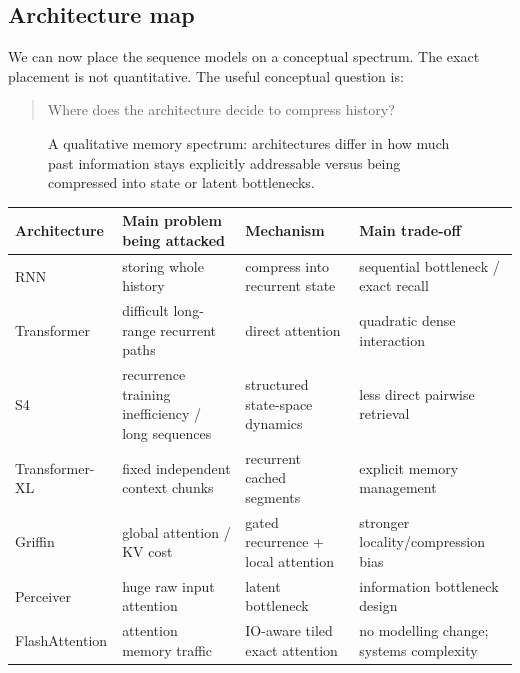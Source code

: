 \subsection{Architecture map}
\label{subsec:modern-architecture-map}
We can now place the sequence models on a conceptual spectrum.
The exact placement is not quantitative.
The useful conceptual question is:

\begin{quote}
Where does the architecture decide to compress history?
\end{quote}

\begin{figure}[htbp]
\centering
{}
\caption{A qualitative memory spectrum: architectures differ in how much past information stays explicitly addressable versus being compressed into state or latent bottlenecks.}
\label{fig:modern-architecture-memory-spectrum}
\end{figure}

\begin{center}
\small
\begin{tabularx}{.98\linewidth}{@{}L{.18\linewidth}L{.26\linewidth}YY@{}}
\toprule
\textbf{Architecture} & \textbf{Main problem being attacked} & \textbf{Mechanism} & \textbf{Main trade-off} \\
\midrule
RNN & storing whole history & compress into recurrent state & sequential bottleneck / exact recall \\
Transformer & difficult long-range recurrent paths & direct attention & quadratic dense interaction \\
S4 & recurrence training inefficiency / long sequences & structured state-space dynamics & less direct pairwise retrieval \\
Transformer-XL & fixed independent context chunks & recurrent cached segments & explicit memory management \\
Griffin & global attention / KV cost & gated recurrence + local attention & stronger locality/compression bias \\
Perceiver & huge raw input attention & latent bottleneck & information bottleneck design \\
FlashAttention & attention memory traffic & IO-aware tiled exact attention & no modelling change; systems complexity \\
\bottomrule
\end{tabularx}
\end{center}

